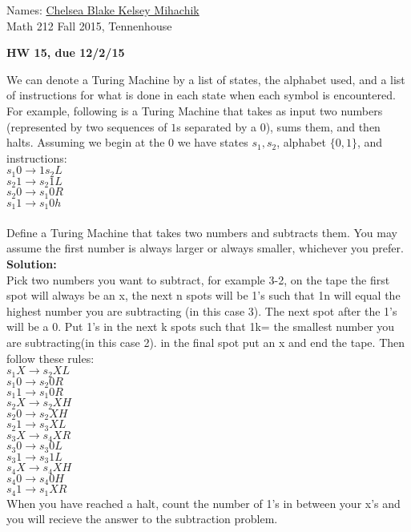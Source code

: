 \documentclass[12pt,letterpaper]{exam}
\begin{document}
\setlength{\pdfpageheight}{\paperheight}
\setlength{\pdfpagewidth}{\paperwidth}

\newcommand{\ud}{\,\mathrm{d}}
\pointsinmargin

Names: \underline{Chelsea Blake Kelsey Mihachik \hspace{3in}}\\
Math 212 Fall 2015, Tennenhouse \\


\begin{center}
\textbf{HW 15, due 12/2/15}\\
\end{center}


\begin{questions}


\question
We can denote a Turing Machine by a list of states, the alphabet used, and a list of instructions for what is done in each state when each symbol is encountered. For example, following is a Turing Machine that takes as input two numbers (represented by two sequences of $1$s separated by a $0$), sums them, and then halts. Assuming we begin at the $0$ we have states $s_1,s_2$, alphabet $\{0,1\}$, and instructions:
\\$s_1 0 \rightarrow 1 s_2 L$
\\$s_2 1 \rightarrow s_2 1 L$
\\$s_2 0 \rightarrow s_1 0 R$
\\$s_1 1 \rightarrow s_1 0 h$
\\ \\ Define a Turing Machine that takes two numbers and subtracts them. You may assume the first number is always larger or always smaller, whichever you prefer.
\\
\textbf{Solution:}\\
Pick two numbers you want to subtract, for example 3-2, on the tape the first spot will always be an x, the next n spots will be 1's such that 1n will equal the highest number you are subtracting (in this case 3). The next spot after the 1's will be a 0. Put 1's in the next k spots such that 1k= the smallest number you are subtracting(in this case 2). in the final spot put an x and end the tape. Then follow these rules: 
\\$s_1 X \rightarrow s_2 X L$
\\$s_1 0 \rightarrow s_2 0 R$
\\$s_1 1 \rightarrow s_1 0 R$
\\$s_2 X \rightarrow s_2 X H$
\\$s_2 0 \rightarrow s_2 X H$
\\$s_2 1 \rightarrow s_3 X L$
\\$s_3 X \rightarrow s_4 X R$
\\$s_3 0 \rightarrow s_3 0 L$
\\$s_3 1 \rightarrow s_3 1 L$
\\$s_4 X \rightarrow s_4 X H$
\\$s_4 0 \rightarrow s_4 0 H$
\\$s_4 1 \rightarrow s_1 X R$
\\
When you have reached a halt, count the number of 1's in between your x's and you will recieve the answer to the subtraction problem.


\end{questions}
\end{document}
